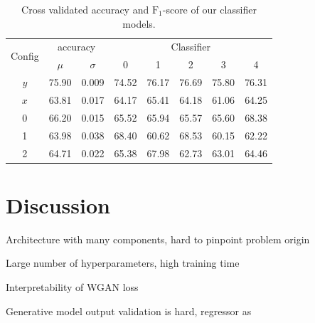 \begin{table}[h]
	\begin{center}
		\begin{tabular}{c c c c c c c c}
			\toprule
			\multirow{2}{*}{Config} & 
			\multicolumn{2}{c}{accuracy} &
			\multicolumn{5}{c}{Classifier} \\
			\cmidrule(lr){2-3}
			\cmidrule(lr){4-8}
			 & $\mu$ & $\sigma$ & 0 & 1 & 2 & 3 & 4 \\
			\cmidrule(lr){1-8}
			$y$ & 75.90 & 0.009 & 74.52 & 76.17 & 76.69 & 75.80 & 76.31 \\
			$x$ & 63.81 & 0.017 & 64.17 & 65.41 & 64.18 & 61.06 & 64.25 \\
			\cmidrule(lr){1-8}
			0   & 66.20 & 0.015 & 65.52 & 65.94 & 65.57 & 65.60 & 68.38 \\
			1   & 63.98 & 0.038 & 68.40 & 60.62 & 68.53 & 60.15 & 62.22 \\
			2   & 64.71 & 0.022 & 65.38 & 67.98 & 62.73 & 63.01 & 64.46 \\
			\cmidrule(lr){1-8}
					
			\bottomrule
		\end{tabular}
		\caption{Cross validated accuracy and $\text{F}_1$-score of our classifier models.}
		\label{tab:expconvresults}
	\end{center}
\end{table} %



\chapter{Discussion}
Architecture with many components, hard to pinpoint problem origin

Large number of hyperparameters, high training time

Interpretability of WGAN loss

Generative model output validation is hard, regressor as 
